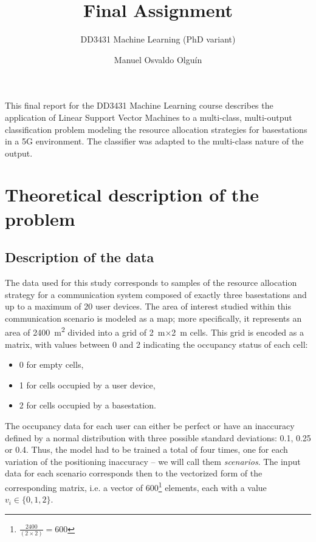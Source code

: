 \documentclass{kthreport}
\title{Final Assignment}
\subtitle{DD3431 Machine Learning (PhD variant)}
\author{Manuel Osvaldo Olguín}
\theoremstyle{definition}
\begin{document}
\maketitle

This final report for the DD3431 Machine Learning course describes the application of Linear Support Vector Machines to a multi-class, multi-output classification problem modeling the resource allocation strategies for basestations in a 5G environment. The classifier was adapted to the multi-class nature of the output.

\section{Theoretical description of the problem}

\subsection{Description of the data}\label{sec:data}

The data used for this study corresponds to samples of the resource allocation strategy for a communication system composed of exactly three basestations and up to a maximum of \num{20} user devices. The area of interest studied within this communication scenario is modeled as a map; more specifically, it represents an area of \SI{2400}{\metre\squared} divided into a grid of \SI{2}{\metre}$\times$\SI{2}{\metre} cells. This grid is encoded as a matrix, with values between \num{0} and \num{2} indicating the occupancy status of each cell:
\begin{itemize}
	\item \num{0} for empty cells,
	\item \num{1} for cells occupied by a user device,
	\item \num{2} for cells occupied by a basestation.
\end{itemize}

The occupancy data for each user can either be perfect or have an inaccuracy defined by a normal distribution with three possible standard deviations: \num{0.1}, \num{0.25} or \num{0.4}. Thus, the model had to be trained a total of four times, one for each variation of the positioning inaccuracy -- we will call them \emph{scenarios}. The input data for each scenario corresponds then to the vectorized form of the corresponding matrix, i.e. a vector of \num{600}\footnote{$\frac{2400}{(2\times2)} = 600$} elements, each with a value $v_i \in \{0, 1, 2\}$.
\end{document}

